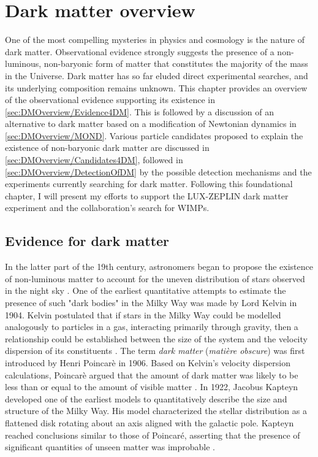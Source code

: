 \chapter{Dark matter overview}\label{chap:DarkMatterOverview}
One of the most compelling mysteries in physics and cosmology is the nature of dark matter. Observational evidence strongly suggests the presence of a non-luminous, non-baryonic form of matter that constitutes the majority of the mass in the Universe. Dark matter has so far eluded direct experimental searches, and its underlying composition remains unknown.
This chapter provides an overview of the observational evidence supporting its existence in \autoref{sec:DMOverview/Evidence4DM}. This is followed by a discussion of an alternative to dark matter based on a modification of Newtonian dynamics in \autoref{sec:DMOverview/MOND}. Various particle candidates proposed to explain the existence of non-baryonic dark matter are discussed in \autoref{sec:DMOverview/Candidates4DM}, followed in \autoref{sec:DMOverview/DetectionOfDM} by the possible detection mechanisms and the experiments currently searching for dark matter. Following this foundational chapter, I will present my efforts to support the LUX-ZEPLIN dark matter experiment and the collaboration's search for WIMPs.

\section{Evidence for dark matter}\label{sec:DMOverview/Evidence4DM}
In the latter part of the 19th century, astronomers began to propose the existence of non-luminous matter to account for the uneven distribution of stars observed in the night sky \cite{HistoryofDM}. One of the earliest quantitative attempts to estimate the presence of such "dark bodies" in the Milky Way was made by Lord Kelvin in 1904. Kelvin postulated that if stars in the Milky Way could be modelled analogously to particles in a gas, interacting primarily through gravity, then a relationship could be established between the size of the system and the velocity dispersion of its constituents \cite{Kelvin1904}. The term \textit{dark matter} (\textit{mati\`ere obscure}) was first introduced by Henri Poincar\`e in 1906. Based on Kelvin’s velocity dispersion calculations, Poincar\`e argued that the amount of dark matter was likely to be less than or equal to the amount of visible matter \cite{HPon}. In 1922, Jacobus Kapteyn developed one of the earliest models to quantitatively describe the size and structure of the Milky Way. His model characterized the stellar distribution as a flattened disk rotating about an axis aligned with the galactic pole. Kapteyn reached conclusions similar to those of Poincaré, asserting that the presence of significant quantities of unseen matter was improbable \cite{Kapteyn1922}.


